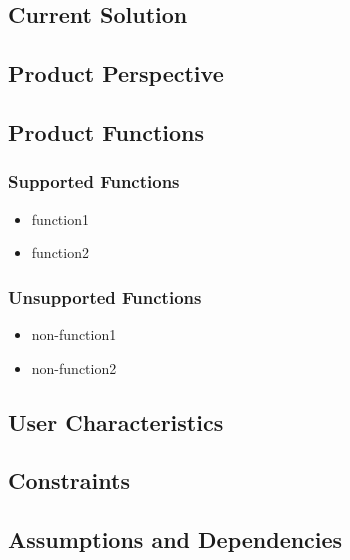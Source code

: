 \subsection{Current Solution}
\label{description:solution}


\subsection{Product Perspective}
\label{description:perspective}


\subsection{Product Functions}
\label{description:functions}

	\subsubsection*{Supported Functions}
	\label{description:functions:supported}
	\begin{itemize}
		\item function1
		\item function2
	\end{itemize}

	\subsubsection*{Unsupported Functions}
	\label{description:functions:unsupported}
	\begin{itemize}
		\item non-function1
		\item non-function2
	\end{itemize}
	

\subsection{User Characteristics}
\label{description:usercharacteristics}


\subsection{Constraints}
\label{description:constraints}


\subsection{Assumptions and Dependencies}
\label{description:assumptions}

